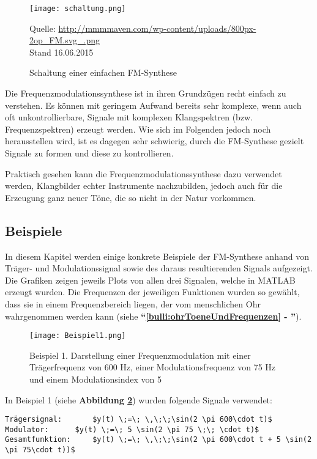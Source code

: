 \begin{figure} [ht]
\centering
  \texttt{[image: schaltung.png]}
\caption{Schaltung einer einfachen FM-Synthese}
\label{fig:schaltung}
Quelle: \url{http://mmmmaven.com/wp-content/uploads/800px-2op_FM.svg_.png} 
\\Stand 16.06.2015
\end{figure}

Die Frequenzmodulationssynthese ist in ihren Grundzügen recht einfach zu verstehen. Es können mit geringem Aufwand bereits sehr komplexe, wenn auch oft unkontrollierbare, Signale mit komplexen Klangspektren (bzw. Frequenzspektren) erzeugt werden. Wie sich im Folgenden jedoch noch herausstellen wird, ist es dagegen sehr schwierig, durch die FM-Synthese gezielt Signale zu formen und diese zu kontrollieren.

Praktisch gesehen kann die Frequenzmodulationssynthese dazu verwendet werden, Klangbilder echter Instrumente nachzubilden, jedoch auch für die Erzeugung ganz neuer Töne, die so nicht in der Natur vorkommen.

\FloatBarrier
\subsection{Beispiele}
In diesem Kapitel werden einige konkrete Beispiele der FM-Synthese anhand von Träger- und Modulationssignal sowie des daraus resultierenden Signals aufgezeigt. Die Grafiken zeigen jeweils Plots von allen drei Signalen, welche in MATLAB erzeugt wurden.
Die Frequenzen der jeweiligen Funktionen wurden so gewählt, dass sie in einem Frequenzbereich liegen, der vom menschlichen Ohr wahrgenommen werden kann (siehe \textbf{``\ref{bulli:ohrToeneUndFrequenzen} - ''}).

\begin{figure} [ht]
\centering
  \texttt{[image: Beispiel1.png]}
\caption{Beispiel 1. Darstellung einer Frequenzmodulation mit einer Trägerfrequenz von 600 Hz, einer Modulationsfrequenz von 75 Hz und einem Modulationsindex von 5 }
\label{fig:beispiel1}
\end{figure}

In Beispiel 1 (siehe \textbf{Abbildung \ref{fig:beispiel1}})  wurden folgende Signale verwendet:

\begin{lstlisting}[mathescape]
Trägersignal: 		$y(t) \;=\; \,\;\;\sin(2 \pi 600\cdot t)$
Modulator:		$y(t) \;=\; 5 \sin(2 \pi 75 \;\; \cdot t)$
Gesamtfunktion: 	$y(t) \;=\; \,\;\;\sin(2 \pi 600\cdot t + 5 \sin(2 \pi 75\cdot t))$
\end{lstlisting}


